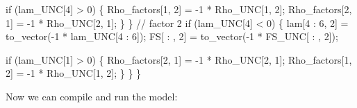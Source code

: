 \documentclass[
  letterpaper,
  DIV=11,
  numbers=noendperiod]{scrreprt}
\newenvironment{Shaded}{\begin{snugshade}}{\end{snugshade}}
\newcommand{\CommentTok}[1]{\textcolor[rgb]{0.37,0.37,0.37}{#1}}
\newcommand{\ControlFlowTok}[1]{\textcolor[rgb]{0.00,0.23,0.31}{#1}}
\newcommand{\DecValTok}[1]{\textcolor[rgb]{0.68,0.00,0.00}{#1}}
\newcommand{\NormalTok}[1]{\textcolor[rgb]{0.00,0.23,0.31}{#1}}
\begin{document}
\begin{Shaded}
\begin{Highlighting}[]
    \ControlFlowTok{if}\NormalTok{ (lam\_UNC[}\DecValTok{4}\NormalTok{] \textgreater{} }\DecValTok{0}\NormalTok{) \{}
\NormalTok{      Rho\_factors[}\DecValTok{1}\NormalTok{, }\DecValTok{2}\NormalTok{] = {-}}\DecValTok{1}\NormalTok{ * Rho\_UNC[}\DecValTok{1}\NormalTok{, }\DecValTok{2}\NormalTok{];}
\NormalTok{      Rho\_factors[}\DecValTok{2}\NormalTok{, }\DecValTok{1}\NormalTok{] = {-}}\DecValTok{1}\NormalTok{ * Rho\_UNC[}\DecValTok{2}\NormalTok{, }\DecValTok{1}\NormalTok{];}
\NormalTok{    \}}
\NormalTok{  \}}
  \CommentTok{// factor 2}
  \ControlFlowTok{if}\NormalTok{ (lam\_UNC[}\DecValTok{4}\NormalTok{] \textless{} }\DecValTok{0}\NormalTok{) \{}
\NormalTok{    lam[}\DecValTok{4}\NormalTok{ : }\DecValTok{6}\NormalTok{, }\DecValTok{2}\NormalTok{] = to\_vector({-}}\DecValTok{1}\NormalTok{ * lam\_UNC[}\DecValTok{4}\NormalTok{ : }\DecValTok{6}\NormalTok{]);}
\NormalTok{    FS[ : , }\DecValTok{2}\NormalTok{] = to\_vector({-}}\DecValTok{1}\NormalTok{ * FS\_UNC[ : , }\DecValTok{2}\NormalTok{]);}
    
    \ControlFlowTok{if}\NormalTok{ (lam\_UNC[}\DecValTok{1}\NormalTok{] \textgreater{} }\DecValTok{0}\NormalTok{) \{}
\NormalTok{      Rho\_factors[}\DecValTok{2}\NormalTok{, }\DecValTok{1}\NormalTok{] = {-}}\DecValTok{1}\NormalTok{ * Rho\_UNC[}\DecValTok{2}\NormalTok{, }\DecValTok{1}\NormalTok{];}
\NormalTok{      Rho\_factors[}\DecValTok{1}\NormalTok{, }\DecValTok{2}\NormalTok{] = {-}}\DecValTok{1}\NormalTok{ * Rho\_UNC[}\DecValTok{1}\NormalTok{, }\DecValTok{2}\NormalTok{];}
\NormalTok{    \}}
\NormalTok{  \}}
\NormalTok{\}}
\end{Highlighting}
\end{Shaded}

Now we can compile and run the model:
\end{document}
